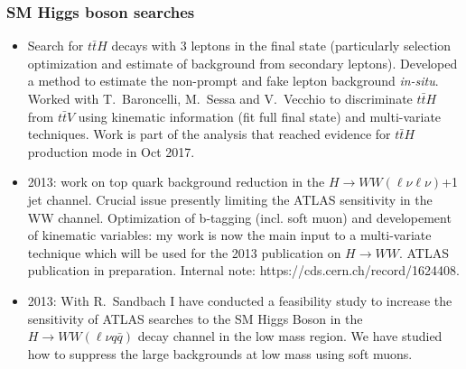 \documentclass{article}
\begin{document}
\begin{vita}
\subsubsection*{SM Higgs boson searches}
\begin {itemize}
\item Search for $t\bar{t}H$ decays with 3 leptons in the final state (particularly selection optimization and estimate of background from secondary leptons). Developed a method to estimate the non-prompt and fake lepton background {\it in-situ}. Worked with T.~Baroncelli, M.~Sessa and V.~Vecchio to discriminate $t\bar{t}H$ from $t\bar{t}V$ using kinematic information (fit full final state) and multi-variate techniques. Work is part of the analysis that reached evidence for $t\bar{t}H$ production mode in Oct 2017.  
\item 2013: work on top quark background reduction in the $H\rightarrow W W (\ell \nu \ell \nu)$+1 jet channel. Crucial issue presently limiting the ATLAS sensitivity in the WW channel. Optimization of b-tagging (incl. soft muon) and developement of kinematic variables: my work is now the main input to a multi-variate technique which will be used for the 2013 publication on $H\rightarrow W W$. ATLAS publication in preparation. Internal note: https://cds.cern.ch/record/1624408.
\item 2013: With R.~Sandbach I have conducted a feasibility study to increase the sensitivity of ATLAS searches to the SM Higgs Boson in the $H\rightarrow W W (\ell \nu q \bar{q})$ decay channel in the low mass region. We have studied how to suppress the large backgrounds at low mass using soft muons.
\end{itemize}


\end{vita}
\end{document}
